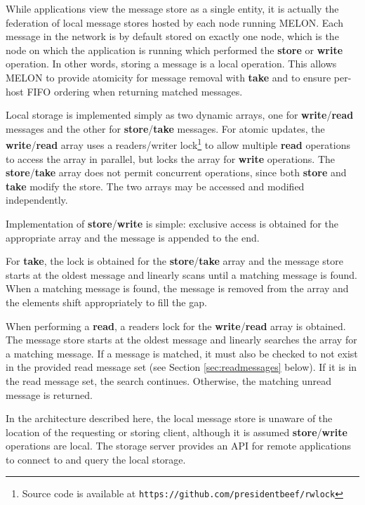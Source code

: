 While applications view the message store as a single entity, it is actually the federation of local message stores hosted by each node running MELON. Each message in the network is by default stored on exactly one node, which is the node on which the application is running which performed the \textbf{store} or \textbf{write} operation. In other words, storing a message is a local operation. This allows MELON to provide atomicity for message removal with \textbf{take} and to ensure per-host FIFO ordering when returning matched messages.

Local storage is implemented simply as two dynamic arrays, one for \textbf{write}/\textbf{read} messages and the other for \textbf{store}/\textbf{take} messages. For atomic updates, the \textbf{write}/\textbf{read} array uses a readers/writer lock\footnote{Source code is available at \texttt{https://github.com/presidentbeef/rwlock}} to allow multiple \textbf{read} operations to access the array in parallel, but locks the array for \textbf{write} operations. The \textbf{store}/\textbf{take} array does not permit concurrent operations, since both \textbf{store} and \textbf{take} modify the store. The two arrays may be accessed and modified independently.

Implementation of \textbf{store}/\textbf{write} is simple: exclusive access is obtained for the appropriate array and the message is appended  to the end. 

For \textbf{take}, the lock is obtained for the \textbf{store}/\textbf{take} array and the message store starts at the oldest message and linearly scans until a matching message is found. When a matching message is found, the message is removed from the array and the elements shift appropriately to fill the gap.

When performing a \textbf{read}, a readers lock for the \textbf{write}/\textbf{read} array is obtained. The message store starts at the oldest message and linearly searches the array for a matching message. If a message is matched, it must also be checked to not exist in the provided read message set (see Section \ref{sec:readmessages} below). If it is in the read message set, the search continues. Otherwise, the matching unread message is returned.

In the architecture described here, the local message store is unaware of the location of the requesting or storing client, although it is assumed \textbf{store}/\textbf{write} operations are local. The storage server provides an API for remote applications to connect to and query the local storage.

